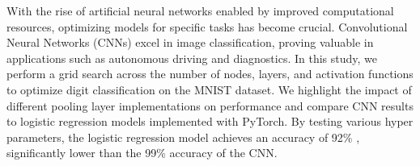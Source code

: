 With the rise of artificial neural networks enabled by improved computational resources, optimizing models for specific tasks has become crucial. Convolutional Neural Networks (CNNs) excel in image classification, proving valuable in applications such as autonomous driving and diagnostics. In this study, we perform a grid search across the number of nodes, layers, and activation functions to optimize digit classification on the MNIST dataset. We highlight the impact of different pooling layer implementations on performance and compare CNN results to logistic regression models implemented with PyTorch. By testing various hyper parameters, the logistic regression model achieves an accuracy of 92\% , significantly lower than the 99\% accuracy of the CNN.